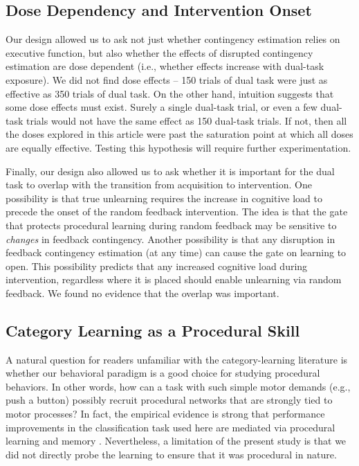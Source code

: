\documentclass[apacite,draftfirst,jou]{apa6}
\begin{document}
\subsection*{Dose Dependency and Intervention Onset}
Our design allowed us to ask not just whether contingency estimation relies on
executive function, but also whether the effects of disrupted contingency
estimation are dose dependent (i.e., whether effects increase with dual-task
exposure). We did not find dose effects -- 150 trials of dual task were just as
effective as 350 trials of dual task. On the other hand, intuition suggests that
some dose effects must exist. Surely a single dual-task trial, or even a few
dual-task trials would not have the same effect as 150 dual-task trials. If not,
then all the doses explored in this article were past the saturation point at
which all doses are equally effective. Testing this hypothesis will require
further experimentation.

Finally, our design also allowed us to ask whether it is important for the dual
task to overlap with the transition from acquisition to intervention. One
possibility is that true unlearning requires the increase in cognitive load to
precede the onset of the random feedback intervention. The idea is that the gate
that protects procedural learning during random feedback may be sensitive to
\textit{changes} in feedback contingency. Another possibility is that any
disruption in feedback contingency estimation (at any time) can cause the gate
on learning to open. This possibility predicts that any increased cognitive load
during intervention, regardless where it is placed should enable unlearning via
random feedback. We found no evidence that the overlap was important.

\subsection*{Category Learning as a Procedural Skill}
A natural question for readers unfamiliar with the category-learning literature
is whether our behavioral paradigm is a good choice for studying procedural
behaviors. In other words, how can a task with such simple motor demands (e.g.,
push a button) possibly recruit procedural networks that are strongly tied to
motor processes? In fact, the empirical evidence is strong that performance
improvements in the classification task used here are mediated via procedural
learning and memory \cite{AshbyMaddox2005, AshbyMaddox2010, AshbyValentin2016a}.
Nevertheless, a limitation of the present study is that we did not directly
probe the learning to ensure that it was procedural in nature.
\end{document}
